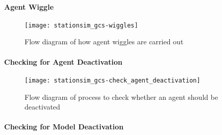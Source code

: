 \paragraph{Agent Wiggle}\label{para:submodels:agent_wiggle}

\begin{figure}[h]
    \centering
    \texttt{[image: stationsim\_gcs-wiggles]}
    \caption{Flow diagram of how agent wiggles are carried
    out}\label{fig:flow:agent_wiggles}
\end{figure}

\paragraph{Checking for Agent
Deactivation}\label{para:submodels:agent_deactivation}

\begin{figure}[h]
    \centering
    \texttt{[image: stationsim\_gcs-check\_agent\_deactivation]}
    \caption{Flow diagram of process to check whether an agent should be
    deactivated}\label{fig:flow:check_agent_deactivation}
\end{figure}

\paragraph{Checking for Model
Deactivation}\label{para:submodels:model_deactivation}

